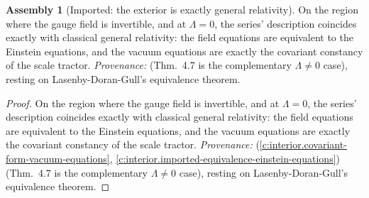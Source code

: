\documentclass[11pt]{article}
\theoremstyle{definition}
\newtheorem{assembled}[theorem]{Assembly}
\theoremstyle{plain}
\begin{document}
\begin{assembled}[Imported: the exterior is exactly general relativity]\label{c:hawking.imported-exterior-exactly-general-relativity}
On the region where the gauge field is invertible, and at $\Lambda = 0$, the series' description coincides exactly with classical general relativity: the field equations are equivalent to the Einstein equations, and the vacuum equations are exactly the covariant constancy of the scale tractor. \emph{Provenance:} \cite[Fact 2.1, Thms.~4.5 and 4.7]{ButlerT6} (Thm.~4.7 is the complementary $\Lambda \neq 0$ case), resting on Lasenby-Doran-Gull's equivalence theorem.
\end{assembled}
\begin{proof}
On the region where the gauge field is invertible, and at $\Lambda = 0$, the series' description coincides exactly with classical general relativity: the field equations are equivalent to the Einstein equations, and the vacuum equations are exactly the covariant constancy of the scale tractor. \emph{Provenance:} \cite[Fact 2.1, Thms.~4.5 and 4.7]{ButlerT6} (\ref{c:interior.covariant-form-vacuum-equations}, \ref{c:interior.imported-equivalence-einstein-equations}) (Thm.~4.7 is the complementary $\Lambda \neq 0$ case), resting on Lasenby-Doran-Gull's equivalence theorem.

\end{proof}
\end{document}
